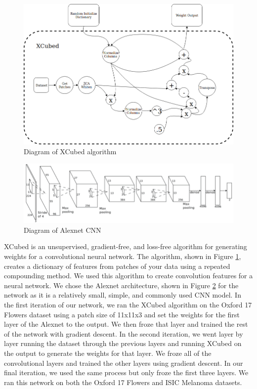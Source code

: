 \documentclass[twocolumn]{article}
\begin{document}
\begin{figure}[ht]
    \centering
    \includegraphics[width=.8\linewidth]{XCubed_diagram}
    \caption{Diagram of XCubed algorithm}
    \label{fig:diagram}
\end{figure}
\begin{figure}[ht]
    \centering
    \includegraphics[width=.8\linewidth]{Alexnet_diagram}
    \caption{Diagram of Alexnet CNN}
    \label{fig:alex}
\end{figure}
XCubed is an unsupervised, gradient-free, and loss-free algorithm for generating weights for a convolutional neural network. The algorithm, shown in Figure \ref{fig:diagram}, creates a dictionary of features from patches of your data using a repeated compounding method. We used this algorithm to create convolution features for a neural network. We chose the Alexnet\cite{alexnet} architecture, shown in Figure \ref{fig:alex} for the network as it is a relatively small, simple, and commonly used CNN model. In the first iteration of our network, we ran the XCubed algorithm on the Oxford 17 Flowers dataset\cite{flowers} using a patch size of 11x11x3 and set the weights for the first layer of the Alexnet to the output. We then froze that layer and trained the rest of the network with gradient descent. In the second iteration, we went layer by layer running the dataset through the previous layers and running XCubed on the output to generate the weights for that layer. We froze all of the convolutional layers and trained the other layers using gradient descent. In our final iteration, we used the same process but only froze the first three layers. We ran this network on both the Oxford 17 Flowers and ISIC Melanoma datasets.
\end{document}

